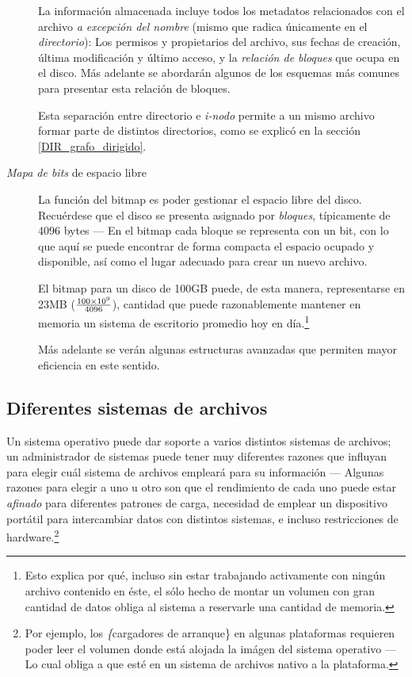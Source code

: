 \documentclass[11pt,fleqn]{book} %
\begin{document}
\begin{description}
	    La información almacenada incluye todos los metadatos
            relacionados con el archivo \emph{a excepción del nombre}
            (mismo que radica únicamente en el \emph{directorio}): Los
            permisos y propietarios del archivo, sus fechas de
            creación, última modificación y último acceso, y la
            \emph{relación de bloques} que ocupa en el disco. Más adelante
            se abordarán algunos de los esquemas más comunes para
            presentar esta relación de bloques.

	    Esta separación entre directorio e \emph{i-nodo} permite a un
            mismo archivo formar parte de distintos directorios, como
            se explicó en la sección \ref{DIR_grafo_dirigido}.
\item[\emph{Mapa de bits} de espacio libre] La función del bitmap es poder gestionar
     el espacio libre del disco. Recuérdese que el disco se presenta
     asignado por \emph{bloques}, típicamente de 4096 bytes — En el bitmap
     cada bloque se representa con un bit, con lo que aquí se puede
     encontrar de forma compacta el espacio ocupado y disponible, así
     como el lugar adecuado para crear un nuevo archivo.

     El bitmap para un disco de 100GB puede, de esta manera,
     representarse en 23MB ($100 \times 10^9 \over 4096$), cantidad
     que puede razonablemente mantener en memoria un sistema de
     escritorio promedio hoy en día.\footnote{Esto explica por qué,
     incluso sin estar trabajando activamente con ningún archivo
     contenido en éste, el sólo hecho de montar un volumen con gran
     cantidad de datos obliga al sistema a reservarle una cantidad de
     memoria. }

     Más adelante se verán algunas estructuras avanzadas que permiten
     mayor eficiencia en este sentido.
\end{description}
\subsection{Diferentes sistemas de archivos}
\label{sec-7-1-2}


Un sistema operativo puede dar soporte a varios distintos sistemas de
archivos; un administrador de sistemas puede tener muy diferentes
razones que influyan para elegir cuál sistema de
archivos empleará para su información — Algunas razones para
elegir a uno u otro son que el rendimiento de cada uno puede estar
\emph{afinado} para diferentes patrones de carga, necesidad de emplear un
dispositivo portátil para intercambiar datos con distintos sistemas, e
incluso restricciones de hardware.\footnote{Por ejemplo, los \emph\{cargadores
de arranque\} en algunas plataformas requieren poder leer el volumen
donde está alojada la imágen del sistema operativo — Lo cual obliga a
que esté en un sistema de archivos nativo a la plataforma. }
\end{document}
